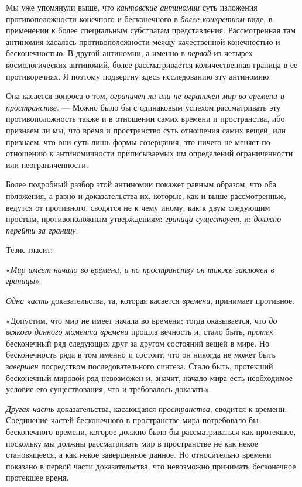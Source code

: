 {Мы уже упомянули выше, что {\em кантовские антиномии}
суть изложения противоположности конечного и бесконечного в
{\em более конкретном} виде, в применении к более
специальным субстратам представления. Рассмотренная там антиномия касалась
противоположности между качественной конечностью и бесконечностью. В другой
антиномии, а именно в {\em первой} из четырех
космологических антиномий, более рассматривается количественная граница в
ее противоречиях. Я поэтому подвергну здесь исследованию эту антиномию.

Она касается вопроса о том, {\em ограничен ли или не
ограничен мир во времени и пространстве}. — Можно было бы с одинаковым
успехом рассматривать эту противоположность также и в отношении самих
времени и пространства, ибо признаем ли мы, что время и пространство суть
отношения самих вещей, или признаем, что они суть лишь формы созерцания,
это ничего не меняет по отношению к антиномичности приписываемых им
определений ограниченности или неограниченности.

Более подробный разбор этой антиномии покажет равным образом, что оба
положения, а равно и доказательства их, которые, как и выше рассмотренные,
ведутся от противного, сводятся не к чему иному, как к двум следующим
простым, противоположным утверждениям: {\em граница
существует}, и: {\em должно перейти за границу}.

Тезис гласит:

«{\em Мир имеет начало во времени, и по пространству он
также заключен в границы}».

{\em Одна часть} доказательства, та, которая касается
{\em времени}, принимает противное.

«Допустим, что мир не имеет начала во времени; тогда оказывается, что
{\em до всякого данного момента времени} прошла
вечность и, стало быть, {\em протек} бесконечный ряд
следующих друг за другом состояний вещей в мире. Но бесконечность ряда в
том именно и состоит, что он никогда не может быть
{\em завершен} посредством последовательного синтеза.
Стало быть, протекший бесконечный мировой ряд невозможен и, значит, начало
мира есть необходимое условие его существования, что и требовалось
доказать».

{\em Другая часть} доказательства, касающаяся
{\em пространства}, сводится к времени. Соединение
частей бесконечного в пространстве мира потребовало бы бесконечного
времени, которое должно было бы рассматриваться как протекшее, поскольку мы
должны рассматривать мир в пространстве не как некое становящееся, а как
некое завершенное данное. Но относительно времени показано в первой части
доказательства, что невозможно принимать бесконечное протекшее время.

}
